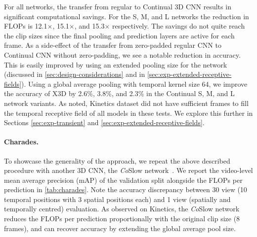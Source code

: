 For all networks, the transfer from regular to Continual 3D CNN results in significant computational savings. 
For the S, M, and L networks the reduction in FLOPs is 12.1$\times$, 15.1$\times$, and 15.3$\times$ respectively.
The savings do not quite reach the clip sizes since the final pooling and prediction layers are active for each frame.
As a side-effect of the transfer from zero-padded regular CNN to Continual CNN without zero-padding, we see a notable reduction in accuracy. 
This is easily improved by using an extended pooling size for the network (discussed in \cref{sec:design-considerations} and in \cref{sec:exp-extended-receptive-fields}). 
Using a global average pooling with temporal kernel size 64, we improve the accuracy of X3D by 2.6\%, 3.8\%, and 2.3\% in the Continual S, M, and L network variants.
As noted, Kinetics dataset did not have sufficient frames to fill the temporal receptive field of all models in these tests.
We explore this further in Sections \ref{sec:exp-transient} and \ref{sec:exp-extended-receptive-fields}. 



\vspace{-3mm}
\paragraph{Charades.}
To showcase the generality of the approach, we repeat the above described procedure with another 3D CNN, the \textit{Co}Slow network~\cite{feichtenhofer2019slowfast}. 
We report the video-level mean average precision (mAP) of the validation split alongside the FLOPs per prediction in \cref{tab:charades}. Note the accuracy discrepancy between 30 view (10 temporal positions with 3 spatial positions each) and 1 view (spatially and temporally centred) evaluation. As observed on Kinetics, the \textit{Co}Slow network reduces the FLOPs per prediction proportionally with the original clip size (8 frames), and can recover accuracy by extending the global average pool size.


